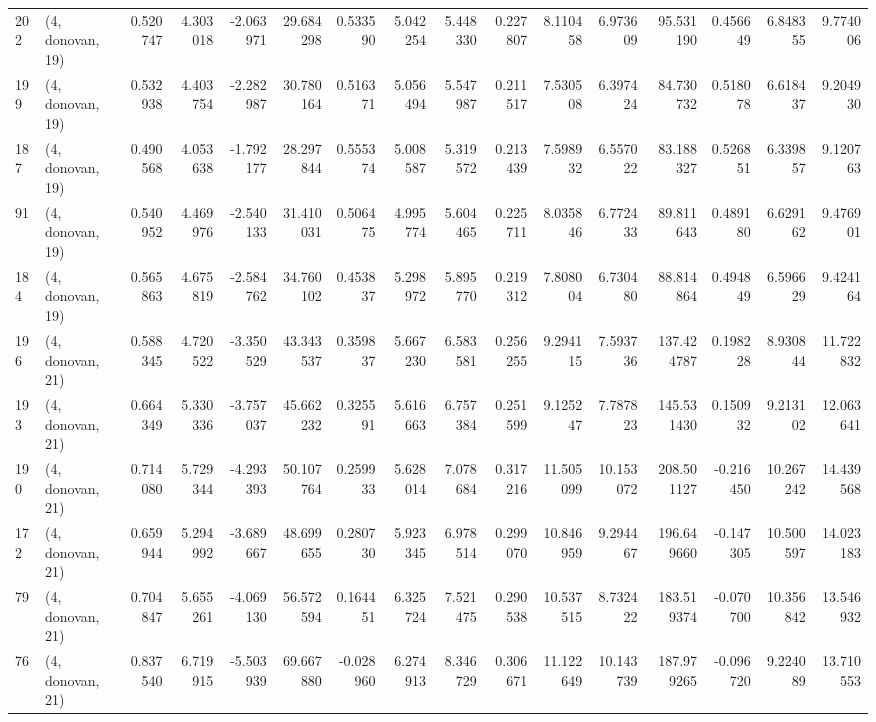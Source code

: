 \begin{tabular}{llrrrrrrrrrrrrrr}
202 &  (4, donovan, 19) &   0.520747 &   4.303018 & -2.063971 &   29.684298 &  0.533590 &   5.042254 &   5.448330 &  0.227807 &   8.110458 &   6.973609 &   95.531190 &  0.456649 &   6.848355 &   9.774006 \\
199 &  (4, donovan, 19) &   0.532938 &   4.403754 & -2.282987 &   30.780164 &  0.516371 &   5.056494 &   5.547987 &  0.211517 &   7.530508 &   6.397424 &   84.730732 &  0.518078 &   6.618437 &   9.204930 \\
187 &  (4, donovan, 19) &   0.490568 &   4.053638 & -1.792177 &   28.297844 &  0.555374 &   5.008587 &   5.319572 &  0.213439 &   7.598932 &   6.557022 &   83.188327 &  0.526851 &   6.339857 &   9.120763 \\
91  &  (4, donovan, 19) &   0.540952 &   4.469976 & -2.540133 &   31.410031 &  0.506475 &   4.995774 &   5.604465 &  0.225711 &   8.035846 &   6.772433 &   89.811643 &  0.489180 &   6.629162 &   9.476901 \\
184 &  (4, donovan, 19) &   0.565863 &   4.675819 & -2.584762 &   34.760102 &  0.453837 &   5.298972 &   5.895770 &  0.219312 &   7.808004 &   6.730480 &   88.814864 &  0.494849 &   6.596629 &   9.424164 \\
196 &  (4, donovan, 21) &   0.588345 &   4.720522 & -3.350529 &   43.343537 &  0.359837 &   5.667230 &   6.583581 &  0.256255 &   9.294115 &   7.593736 &  137.424787 &  0.198228 &   8.930844 &  11.722832 \\
193 &  (4, donovan, 21) &   0.664349 &   5.330336 & -3.757037 &   45.662232 &  0.325591 &   5.616663 &   6.757384 &  0.251599 &   9.125247 &   7.787823 &  145.531430 &  0.150932 &   9.213102 &  12.063641 \\
190 &  (4, donovan, 21) &   0.714080 &   5.729344 & -4.293393 &   50.107764 &  0.259933 &   5.628014 &   7.078684 &  0.317216 &  11.505099 &  10.153072 &  208.501127 & -0.216450 &  10.267242 &  14.439568 \\
172 &  (4, donovan, 21) &   0.659944 &   5.294992 & -3.689667 &   48.699655 &  0.280730 &   5.923345 &   6.978514 &  0.299070 &  10.846959 &   9.294467 &  196.649660 & -0.147305 &  10.500597 &  14.023183 \\
79  &  (4, donovan, 21) &   0.704847 &   5.655261 & -4.069130 &   56.572594 &  0.164451 &   6.325724 &   7.521475 &  0.290538 &  10.537515 &   8.732422 &  183.519374 & -0.070700 &  10.356842 &  13.546932 \\
76  &  (4, donovan, 21) &   0.837540 &   6.719915 & -5.503939 &   69.667880 & -0.028960 &   6.274913 &   8.346729 &  0.306671 &  11.122649 &  10.143739 &  187.979265 & -0.096720 &   9.224089 &  13.710553 \\

\end{tabular}
